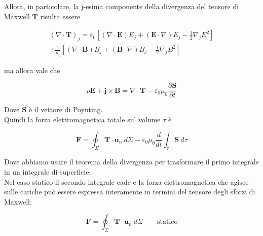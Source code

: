 Allora, in particolare, la j-esima componente della divergenza del tensore di Maxwell $\mathbf{T}$ risulta essere

\begin{align}
    \left( \nabla \cdot \mathbf{T} \right)_j = \varepsilon_0 \left[ (\nabla \cdot \mathbf{E})E_j + (\mathbf{E} \cdot \nabla) E_j - \frac{1}{2}\nabla_jE^2 \right]\\
    + \frac{1}{\mu_0}\left[ (\nabla \cdot \mathbf{B})B_j + (\mathbf{B} \cdot \nabla) B_j - \frac{1}{2}\nabla_jB^2 \right]
\end{align}

ma allora vale che 

\begin{tcolorbox}[colback=yellow!10!white, colframe=orange!70!black, boxrule=0.8pt]
\begin{equation}
    \rho \mathbf{E} + \mathbf{j} \times \mathbf{B} = \nabla \cdot \mathbf{T} - \varepsilon_0\mu_0 \frac{\partial \mathbf{S}}{\partial t}
\end{equation}
\end{tcolorbox}

Dove $\mathbf{S}$ è il vettore di Poynting. \\

Quindi la forza elettromagnetica totale sul volume $\tau$ è 

\begin{tcolorbox}[colback=yellow!10!white, colframe=orange!70!black, boxrule=0.8pt]
\begin{equation}
    \mathbf{F} = \oint_{\Sigma} \mathbf{T} \cdot \mathbf{u}_n \ d\Sigma - \varepsilon_0 \mu_0 \frac{d}{dt} \int_{\tau} \mathbf{S} \ d\tau 
\end{equation}
\end{tcolorbox}

Dove abbiamo usare il teorema della divergenza per trasformare il primo integrale in un integrale di superficie. \\

Nel caso statico il secondo integrale cade e la forza elettromagnetica che agisce sulle cariche può essere espressa interamente in termini del tensore degli sforzi di Maxwell:

\begin{tcolorbox}[colback=yellow!10!white, colframe=orange!70!black, boxrule=0.8pt]
\begin{equation}
    \mathbf{F} = \oint_{\Sigma} \mathbf{T} \cdot \mathbf{u}_n \ d\Sigma \qquad \text{statico}
\end{equation}
\end{tcolorbox}

